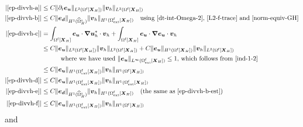 \documentclass[11pt,reqno]{amsart}
\theoremstyle{definition}
\theoremstyle{plain}
\numberwithin{theorem}{section}
\numberwithin{proposition}{section}
\numberwithin{lemma}{section}
\numberwithin{equation}{section}
\newcommand{\bs}[1]{\boldsymbol{#1}}
\newcommand{\uu}[1]  {{\bs{#1}} }
\newcommand{\dep}{{{\bs{d}}}}
\newcommand{\grad}   { \uu{\nabla}    }
\newcommand{\bu}{\uu{u}}
\renewcommand{\(}{\bigl(}
\renewcommand{\)}{\bigr)}
\begin{document}
\begin{subequations}\label{ep-divvh-abcdef}
\begin{align}
|\eqref{ep-divvh-a}|
&\le C\|\partial_t {\bs e}_{\bs u}\|_{L^2(\Omega^{\rm f}[\bs X_H])} \|{\bs v}_h\|_{L^2(\Omega^{\rm f}[\bs X_H])} \\
|\eqref{ep-divvh-b}|
&\le C\|{\bs e}_\dep\|_{H^1(\widehat{\Omega}^{\rm s}_H)} \|{\bs v}_h\|_{H^1(\Omega^{\rm f}_{\rm ext}[\bs X_H])} 
\quad\mbox{using \eqref{dt-int-Omega-2}, \eqref{L2-f-trace} and \eqref{norm-equiv-GH}}
\label{ep-divvh-b-est}\\
|\eqref{ep-divvh-c}|
&=
\int_{\Omega^{\rm f}[\bs X_H]} {\bs e}_{\bs u} \cdot \grad \bu_h^* \cdot {\bs v}_h
+ \int_{\Omega^{\rm f}[\bs X_H]} {\bs e}_{\bs u} \cdot \grad {\bs e}_{\bs u} \cdot {\bs v}_h \notag\\ 
&\le C\|{\bs e}_{\bs u}\|_{L^2(\Omega^{\rm f}[{\bs X}_H])} \|{\bs v}_h\|_{L^2(\Omega^{\rm f}[{\bs X}_H])}
+ C\|{\bs e}_{\bs u}\|_{H^1(\Omega^{\rm f}[{\bs X}_H])} \|{\bs v}_h\|_{L^2(\Omega^{\rm f}[{\bs X}_H])} \notag\\
&\hspace{20pt} 
\quad\mbox{where we have used $\|{\bs e}_{\bs u}\|_{L^\infty(\Omega^{\rm f}_{\rm ext}[\bs X_H])} \le 1$, which follows from \eqref{ind-1-2}} \notag\\
&\le C\|{\bs e}_{\bs u}\|_{H^1(\Omega^{\rm f}_{\rm ext}[{\bs X}_H])} \|{\bs v}_h\|_{H^1(\Omega^{\rm f}[{\bs X}_H])} \\
|\eqref{ep-divvh-d}|
&\le C\|{\bs e}_{\bs u}\|_{H^1(\Omega^{\rm f}_{\rm ext}[{\bs X}_H])} \|{\bs v}_h\|_{H^1(\Omega^{\rm f}_{\rm ext}[{\bs X}_H])} \\
|\eqref{ep-divvh-e}|
&\le C\|{\bs e}_\dep\|_{H^1(\widehat{\Omega}^{\rm s}_H)} \|{\bs v}_h\|_{H^1(\Omega^{\rm f}_{\rm ext}[\bs X_H])} 
\quad\mbox{(the same as \eqref{ep-divvh-b-est})}\\
|\eqref{ep-divvh-f}|
&\le C\|{\bs e}_{\bs u}\|_{H^1(\Omega^{\rm f}_{\rm ext}[{\bs X}_H])}\|{\bs v}_h\|_{H^1(\Omega^{\rm f}[\bs X_H])} 
\end{align}
\end{subequations}
and 
\end{document}
